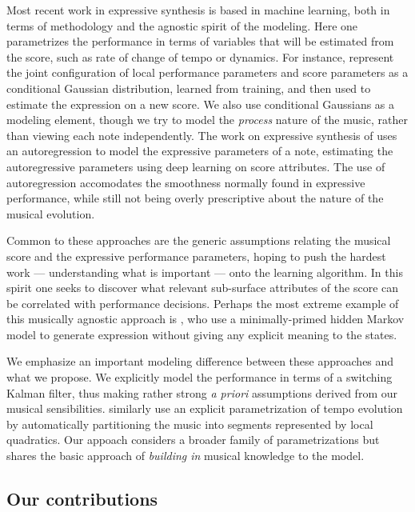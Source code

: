 \documentclass[aoas]{imsart}
\begin{document}
Most recent work in expressive synthesis is based in machine
learning, both in terms of methodology and the agnostic spirit of the
modeling.  Here one parametrizes the performance in terms of variables
that will be estimated from the score, such as rate of change of tempo
or dynamics.  For instance, \citet{Flossman} represent the joint
configuration of local performance parameters and score parameters as
a conditional Gaussian distribution, learned from training, and then
used to estimate the expression on a new score.  We also use
conditional Gaussians as a modeling element, though we try to model
the {\em process} nature of the music, rather than viewing each note
independently.  The work on expressive synthesis of
\citet{Maezawa} uses an autoregression to model the expressive
parameters of a note, estimating the autoregressive parameters using
deep learning on score attributes.  The use of autoregression
accomodates the smoothness normally found in expressive performance,
while still not being overly prescriptive about the nature of the
musical evolution.

Common to these approaches are the generic assumptions relating the
musical score and the expressive performance parameters, hoping to
push the hardest work --- understanding what is important --- onto the
learning algorithm.  In this spirit one seeks to discover what
relevant sub-surface attributes of the score can be correlated with
performance decisions.  Perhaps the most extreme example of this
musically agnostic approach is \citet{Grindlay}, who use a
minimally-primed hidden Markov model to generate expression without
giving any explicit meaning to the states.

We emphasize an important
modeling difference between these approaches and what we propose.  We
explicitly model the performance in terms of a switching Kalman
filter, thus making rather strong {\em a priori} assumptions derived
from our musical sensibilities.
\citet{Chew} similarly use an
explicit parametrization of tempo evolution by automatically
partitioning the music into segments represented by local quadratics.
Our appoach considers a broader family of parametrizations but shares
the basic approach of {\em building in} musical knowledge to the
model.


\subsection{Our contributions}
\label{sec:our-contributions}
\end{document}
